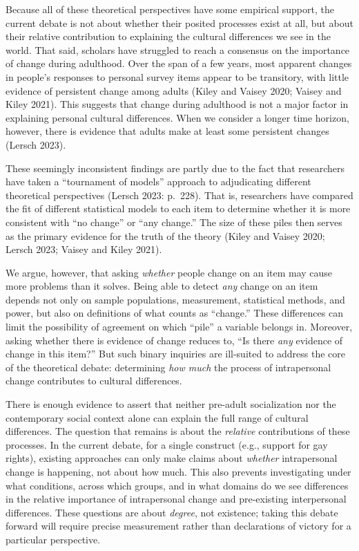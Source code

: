 \documentclass[
  12pt,
]{article}
\begin{document}
Because all of these theoretical perspectives have some empirical
support, the current debate is not about whether their posited processes
exist at all, but about their relative contribution to explaining the
cultural differences we see in the world. That said, scholars have
struggled to reach a consensus on the importance of change during
adulthood. Over the span of a few years, most apparent changes in
people's responses to personal survey items appear to be transitory,
with little evidence of persistent change among adults (Kiley and Vaisey
2020; Vaisey and Kiley 2021). This suggests that change during adulthood
is not a major factor in explaining personal cultural differences. When
we consider a longer time horizon, however, there is evidence that
adults make at least some persistent changes (Lersch 2023).

These seemingly inconsistent findings are partly due to the fact that
researchers have taken a ``tournament of models'' approach to
adjudicating different theoretical perspectives (Lersch 2023: p.~228).
That is, researchers have compared the fit of different statistical
models to each item to determine whether it is more consistent with ``no
change'' or ``any change.'' The size of these piles then serves as the
primary evidence for the truth of the theory (Kiley and Vaisey 2020;
Lersch 2023; Vaisey and Kiley 2021).

We argue, however, that asking \emph{whether} people change on an item
may cause more problems than it solves. Being able to detect \emph{any}
change on an item depends not only on sample populations, measurement,
statistical methods, and power, but also on definitions of what counts
as ``change.'' These differences can limit the possibility of agreement
on which ``pile'' a variable belongs in. Moreover, asking whether there
is evidence of change reduces to, ``Is there \emph{any} evidence of
change in this item?'' But such binary inquiries are ill-suited to
address the core of the theoretical debate: determining \emph{how much}
the process of intrapersonal change contributes to cultural differences.

There is enough evidence to assert that neither pre-adult socialization
nor the contemporary social context alone can explain the full range of
cultural differences. The question that remains is about the
\emph{relative} contributions of these processes. In the current debate,
for a single construct (e.g., support for gay rights), existing
approaches can only make claims about \emph{whether} intrapersonal
change is happening, not about how much. This also prevents
investigating under what conditions, across which groups, and in what
domains do we see differences in the relative importance of
intrapersonal change and pre-existing interpersonal differences. These
questions are about \emph{degree}, not existence; taking this debate
forward will require precise measurement rather than declarations of
victory for a particular perspective.
\end{document}
